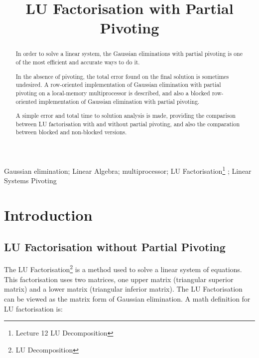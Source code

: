\documentclass[conference,compsoc]{IEEEtran}
\begin{document}
\title{LU Factorisation with Partial Pivoting}


\author{
}


\maketitle

\begin{abstract}

In order to solve a linear system, the Gaussian eliminations with partial pivoting is one of the most efficient and accurate ways to do it.\par 
 In the absence of pivoting, the total error found on the final solution is sometimes undesired. 
A row-oriented implementation of Gaussian elimination with partial pivoting on a local-memory multiprocessor is described, and also a blocked row-oriented implementation of Gaussian elimination with partial pivoting. \par 

A simple error and total time to solution analysis is made, providing the comparison between LU factorisation with and without partial pivoting, and also the comparation between blocked and non-blocked versions.


\end{abstract}


\begin{IEEEkeywords} Gaussian elimination; Linear Algebra; multiprocessor; LU Factorisation\footnote{Lecture 12 LU Decomposition} ; Linear Systems Pivoting \end{IEEEkeywords}


\IEEEpeerreviewmaketitle



\section{Introduction}
\subsection{LU Factorisation without Partial Pivoting}
The LU Factorisation\footnote{LU Decomposition} is a method used to solve a linear system of equations. This factorisation uses two matrices, one upper matrix (triangular superior matrix) and a lower matrix (triangular inferior matrix). The LU Factorisation can be viewed as the matrix form of Gaussian elimination. A math definition for LU factorisation is:
\end{document}
